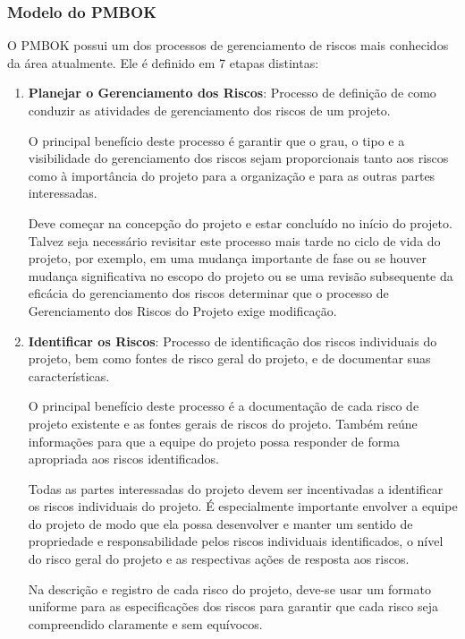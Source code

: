 \documentclass[
	12pt,
	openright,
	twoside,
	a4paper,
	english,
	brazil
	]{abntex2}
\begin{document}

\subsubsection{Modelo do PMBOK}

O PMBOK \cite{PMBOK} possui um dos processos de gerenciamento de riscos mais conhecidos da área atualmente. Ele é definido em 7 etapas distintas:

\begin{enumerate}
  \item \textbf{Planejar o Gerenciamento dos Riscos}: Processo de definição de como conduzir as atividades de gerenciamento dos riscos de um projeto.

  O principal benefício deste processo é garantir que o grau, o tipo e a visibilidade do gerenciamento dos riscos sejam proporcionais tanto aos riscos como à importância do projeto para a organização e para as outras partes interessadas.
  
  Deve começar na concepção do projeto e estar concluído no início do projeto. Talvez seja necessário revisitar este processo mais tarde no ciclo de vida do projeto, por exemplo, em uma mudança importante de fase ou se houver mudança significativa no escopo do projeto ou se uma revisão subsequente da eficácia do gerenciamento dos riscos determinar que o processo de Gerenciamento dos Riscos do Projeto exige modificação.

  \item \textbf{Identificar os Riscos}: Processo de identificação dos riscos individuais do projeto, bem como fontes de risco geral do projeto, e de documentar suas características.
  
  O principal benefício deste processo é a documentação de cada risco de projeto existente e as fontes gerais de riscos do projeto. Também reúne informações para que a equipe do projeto possa responder de forma apropriada aos riscos identificados.
  
  Todas as partes interessadas do projeto devem ser incentivadas a identificar os riscos individuais do projeto. É especialmente importante envolver a equipe do projeto de modo que ela possa desenvolver e manter um sentido de propriedade e responsabilidade pelos riscos individuais identificados, o nível do risco geral do projeto e as respectivas ações de resposta aos riscos.

  Na descrição e registro de cada risco do projeto, deve-se usar um formato uniforme para as especificações dos riscos para garantir que cada risco seja compreendido claramente e sem equívocos.


\end{enumerate}
\end{document}
